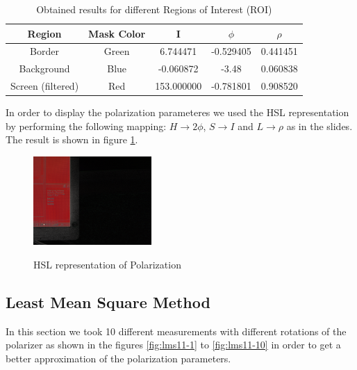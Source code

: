 \documentclass{article}
\begin{document}
\begin{table}
\centering
\begin{tabular}{|c|c|c|c|c|}
\hline
Region & Mask Color & I & $\phi$ & $\rho$ \\ 
\hline
Border & Green & 6.744471 & -0.529405 &  0.441451 \\
Background & Blue & -0.060872 & -3.48 & 0.060838\\
Screen (filtered) & Red & 153.000000 & -0.781801 & 0.908520\\
\hline
\end{tabular}
\caption{Obtained results for different Regions of Interest (ROI)}
\label{tb:wolffres}
\end{table} 

In order to display the polarization parameteres we used the HSL representation
by performing the following mapping: $H \to 2\phi$, $S \to I$ and $L\to\rho$ as 
in the slides.
The result is shown in figure \ref{fig:hsl}.

\begin{figure}[H]
\caption{HSL representation of Polarization}
\centering
\includegraphics[width=0.4\textwidth,natwidth=100,natheight=100]{../wolff/results/result_wolff.png}
\label{fig:hsl}
\end{figure}   

\subsection{Least Mean Square Method}

In this section we took 10 different measurements with different rotations of the 
polarizer as shown in the figures \ref{fig:lms11-1} to \ref{fig:lms11-10} in order to get 
a better approximation of the polarization parameters.
\end{document}
